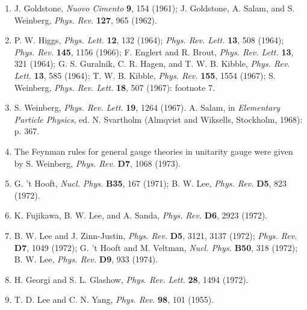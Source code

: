 
\begin{enumerate}
\item {}\label{ch21-ref-1}
J. Goldstone, \emph{Nuovo Cimento} \textbf{9}, 154 (1961); J. Goldstone,
A. Salam, and S. Weinberg, \emph{Phys. Rev.} \textbf{127}, 965 (1962).

\item {}\label{ch21-ref-2}
P. W. Higgs, \emph{Phys. Lett.} \textbf{12}, 132 (1964);
\emph{Phys. Rev. Lett.} \textbf{13}, 508 (1964);
\emph{Phys. Rev.} \textbf{145}, 1156 (1966); F. Englert and R. Brout,
\emph{Phys. Rev. Lett.} \textbf{13}, 321 (1964); G. S. Guralnik,
C. R. Hagen, and T. W. B. Kibble, \emph{Phys. Rev. Lett.} \textbf{13},
585 (1964); T. W. B. Kibble, \emph{Phys. Rev.} \textbf{155}, 1554
(1967); S. Weinberg, \emph{Phys. Rev. Lett.} \textbf{18}, 507 (1967):
footnote 7.

\item {}\label{ch21-ref-3}
S. Weinberg, \emph{Phys. Rev. Lett.} \textbf{19}, 1264 (1967). A. Salam,
in \emph{Elementary Particle Physics}, ed. N. Svartholm (Almqvist and
Wiksells, Stockholm, 1968): p. 367.

\item[3a.] \label{ch21-ref-3a}
The Feynman rules for general gauge theories in unitarity gauge were given
by S. Weinberg, \emph{Phys. Rev.} \textbf{D7}, 1068 (1973).

\item {}\label{ch21-ref-4}
G. 't Hooft, \emph{Nucl. Phys.} \textbf{B35}, 167 (1971); B. W. Lee,
\emph{Phys. Rev.} \textbf{D5}, 823 (1972).

\item {}\label{ch21-ref-5}
K. Fujikawa, B. W. Lee, and A. Sanda, \emph{Phys. Rev.} \textbf{D6},
2923 (1972).

\item[5a.] \label{ch21-ref-5a}
B. W. Lee and J. Zinn-Justin, \emph{Phys. Rev.} \textbf{D5}, 3121, 3137
(1972); \emph{Phys. Rev.} \textbf{D7}, 1049 (1972); G. 't Hooft and
M. Veltman, \emph{Nucl. Phys.} \textbf{B50}, 318 (1972); B. W. Lee,
\emph{Phys. Rev.} \textbf{D9}, 933 (1974).

\item {}\label{ch21-ref-6}
H. Georgi and S. L. Glashow, \emph{Phys. Rev. Lett.} \textbf{28}, 1494
(1972).

\item {}\label{ch21-ref-7}
T. D. Lee and C. N. Yang, \emph{Phys. Rev.} \textbf{98}, 101 (1955).


\end{enumerate}
